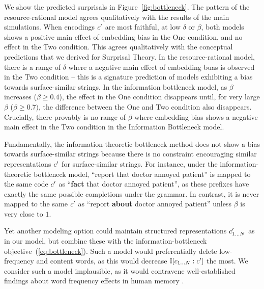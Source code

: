 We show the predicted surprisals in Figure~\ref{fig:bottleneck}.
The pattern of the resource-rational model agrees qualitatively with the results of the main simulations.
When encodings $c'$ are most faithful, at low $\delta$ or $\beta$, both models shows a positive main effect of embedding bias in the One condition, and no effect in the Two condition. This agrees qualitatively with the conceptual predictions that we derived for Surprisal Theory.
In the resource-rational model, there is a range of $\delta$ where a negative main effect of embedding buas is observed in the Two condition -- this is a signature prediction of models exhibiting a bias towards surface-similar strings.
In the information bottleneck model, as $\beta$ increases ($\beta \geq 0.4$), the effect in the One condition disappears until, for very large $\beta$ ($\beta \geq 0.7)$, the difference between the One and Two condition also disappears.
Crucially, there provably is no range of $\beta$ where embedding bias shows a negative main effect in the Two condition in the Information Bottleneck model.

Fundamentally, the information-theoretic bottleneck method does not show a bias towards surface-similar strings because there is no constraint encouraging similar representations $c'$ for surface-similar strings. For instance, under the information-theoretic bottleneck model, ``report that doctor annoyed patient'' is mapped to the same code $c'$ as ``\textbf{fact} that doctor annoyed patient'', as these prefixes have exactly the same possible completions under the grammar.
In contrast, it is never mapped to the same $c'$ as ``report \textbf{about} doctor annoyed patient'' unless $\beta$ is very close to $1$.

Yet another modeling option could maintain structured representations $c'_{1\dots N}$ as in our model, but combine these with the information-bottleneck objective~(\ref{eq:bottleneck}).
Such a model would preferentially delete low-frequency and content words, as this would decrease $\operatorname{I}[c_{1\dots N} : c']$ the most.
We consider such a model implausible, as it would contravene well-established findings about word frequency effects in human memory \citep{Gorman1961RecognitionMF,Glanzer1976AnalysisOT}.


